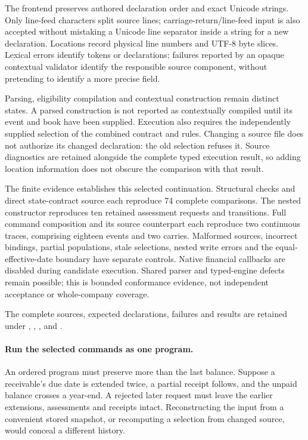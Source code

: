 The frontend preserves authored declaration order and exact Unicode strings.
Only line-feed characters split source lines; carriage-return/line-feed input
is also accepted without mistaking a Unicode line separator inside a string
for a new declaration. Locations record physical line numbers and UTF-8 byte
slices. Lexical errors identify tokens or declarations; failures reported by
an opaque contextual validator identify the responsible source component,
without pretending to identify a more precise field.

Parsing, eligibility compilation and contextual construction remain distinct
states. A parsed construction is not reported as contextually compiled until
its event and book have been supplied. Execution also requires the independently
supplied selection of the combined contract and rules. Changing a source file
does not authorize its changed declaration: the old selection refuses it.
Source diagnostics are retained alongside the complete typed execution result,
so adding location information does not obscure the comparison with that result.

The finite evidence establishes this selected continuation. Structural checks
and direct state-contract source each reproduce 74 complete comparisons. The
nested constructor reproduces ten retained assessment requests and transitions.
Full command composition and its source counterpart each reproduce two
continuous traces, comprising eighteen events and two carries. Malformed
sources, incorrect bindings, partial populations, stale selections, nested
write errors and the equal-effective-date boundary have separate controls.
Native financial callbacks are disabled during candidate execution. Shared
parser and typed-engine defects remain possible; this is bounded conformance
evidence, not independent acceptance or whole-company coverage.

\begingroup\raggedright
The complete sources, expected declarations, failures and results are retained
under ,
,
,
 and
.
\par\endgroup

\paragraph{Run the selected commands as one program.}
An ordered program must preserve more than the last balance. Suppose a
receivable's due date is extended twice, a partial receipt follows, and the
unpaid balance crosses a year-end. A rejected later request must leave the
earlier extensions, assessments and receipts intact. Reconstructing the input
from a convenient stored snapshot, or recomputing a selection from changed
source, would conceal a different history.

